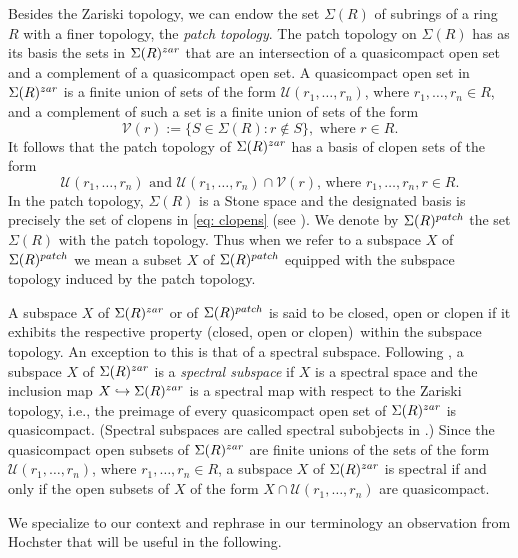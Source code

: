\documentclass[11pt]{amsart}
\theoremstyle{definition}
\def\cal{\mathcal}
\begin{document}
Besides the Zariski topology, we can endow the set $\Sigma(R)$ of subrings of a ring $R$ with a finer topology, the {\it patch topology}. The patch topology on $\Sigma(R)$ has as its basis the sets in $\Sigma(R)^{\rm zar}$ that are an intersection of a quasicompact open set and a complement of a quasicompact open set. A quasicompact open set in $\Sigma(R)^{\rm zar}$ is a finite union of sets of the form ${\cal U}(r_1,\ldots,r_n)$, where $r_1,\ldots,r_n \in R$, and a complement of such a set is a finite union of sets of the form  $${\cal V}(r):=\{S \in \Sigma(R) :r  \not \in S\}, {\mbox{ where }} r \in R.$$ It follows that the patch topology of $\Sigma(R)^{\rm zar}$ has a basis of clopen sets of the form
\begin{equation}\label{eq: clopens}
{\cal U}(r_1,\ldots,r_n)\text{ and }
{\cal U}(r_1,\ldots,r_n) \cap {\cal V}(r)\text{, where }r_1,\ldots,r_n,r \in R.  
\end{equation}
In the patch topology, $\Sigma(R)$ is a Stone space and the designated basis is precisely the set of clopens in \eqref{eq: clopens} (see \cite[Proposition II.4.5]{Joh86}). We denote by ${\Sigma}(R)^{\rm patch}$ the set $\Sigma(R)$ with the patch topology. Thus when we refer to a subspace $X$ of ${\Sigma}(R)^{\rm patch}$ we mean a subset $X$ of $\Sigma(R)^{\rm patch}$ equipped with the subspace topology induced by the patch topology. 

A subspace $X$ of $\Sigma(R)^{\rm zar}$ or of ${\Sigma}(R)^{\rm patch}$ is said to be closed, open or clopen if it exhibits the respective property (closed, open or clopen)~within the subspace topology. An exception to this is that of a spectral subspace. 
Following \cite{ST}, a subspace $X$ of $\Sigma(R)^{\rm zar}$ is a {\it spectral subspace}   if  $X$ is a spectral space and  
the inclusion map $X\hookrightarrow \Sigma(R)^{\rm zar}$ is a spectral map with respect to the Zariski topology, i.e., the preimage of every quasicompact open set of $\Sigma(R)^{\rm zar}$ is quasicompact. (Spectral subspaces are called spectral subobjects in \cite{Hochster}.) Since the quasicompact open subsets of $\Sigma(R)^{\rm zar}$ are finite unions of the sets of the form ${\mathcal{U}}(r_1,\ldots,r_n)$, where $r_1,\ldots,r_n \in R$, a subspace $X$ of $\Sigma(R)^{\rm zar}$ is spectral if and only if the open subsets of $X$  of the form  $X \cap {\mathcal{U}}(r_1,\ldots,r_n)$ are quasicompact.





We specialize to our context and rephrase in our terminology an observation from Hochster \cite[p.~45]{Hochster} that will be useful in the following. 
\end{document}
